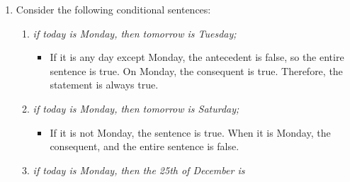 \begin{enumerate}
\begin{enumerate}
{    die;}
    \begin{itemize}
    \item Exclusive
    \end{itemize}
  \item \emph{if I earn a lot of money or win the sweepstake, I shall
    go on a long journey.}
    \begin{itemize}
    \item Non-exclusive
    \end{itemize}
  \end{enumerate}
  Give further examples in which the word ``or'' is used in its first
  or in its second meaning.
  \begin{itemize}
  \item \textbf{Exclusive:}
    \begin{itemize}
    \item \emph{The package will arrive Thursday or Friday.}
    \item \emph{Jefferson or Adams will be elected president.}
    \end{itemize}
  \item \textbf{Non-exclusive:}
    \begin{itemize}
    \item \emph{We have Coke or Pepsi.}
    \item \emph{It is hot outside, or the air conditioning is broken.}
    \end{itemize}
  \end{itemize}
\item Consider the following conditional sentences:
  \begin{enumerate}
  \item \emph{if today is Monday, then tomorrow is Tuesday;}
    \begin{itemize}
    \item If it is any day except Monday, the antecedent is false, so
      the entire sentence is true.  On Monday, the consequent is true.
      Therefore, the statement is always true.
    \end{itemize}
  \item \emph{if today is Monday, then tomorrow is Saturday;}
    \begin{itemize}
    \item If it is not Monday, the sentence is true.  When it is
      Monday, the consequent, and the entire sentence is false.
    \end{itemize}
  \item \emph{if today is Monday, then the 25th of December is
}
\end{enumerate}
\end{enumerate}
